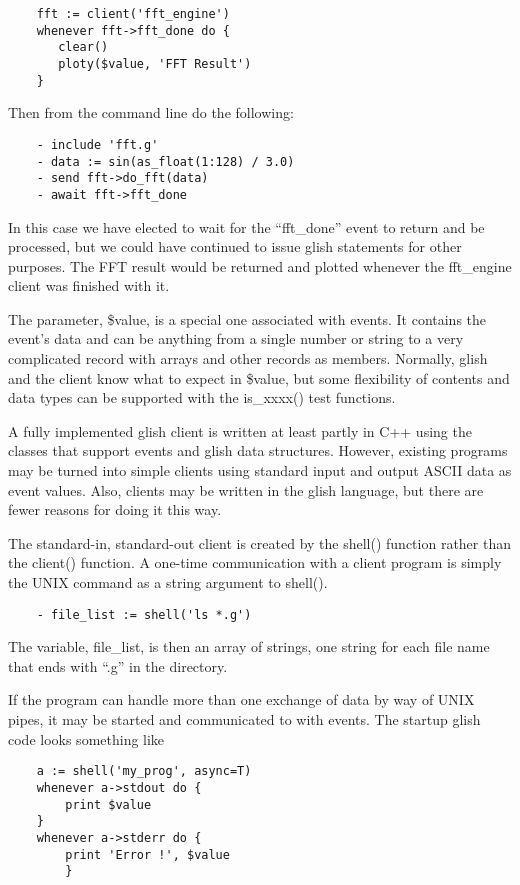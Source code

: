 \begin{verbatim}
	fft := client('fft_engine')
	whenever fft->fft_done do {
	   clear()
	   ploty($value, 'FFT Result')
	}
\end{verbatim}

Then from the command line do the following:

\begin{verbatim}
	- include 'fft.g'
	- data := sin(as_float(1:128) / 3.0)
	- send fft->do_fft(data)
	- await fft->fft_done
\end{verbatim}

    In this case we have elected to wait for the ``fft\_done'' event to return
and be processed, but we could have continued to issue glish statements for
other purposes.  The FFT result would be returned and plotted whenever the
fft\_engine client was finished with it.

    The parameter, \$value, is a special one associated with events.  It
contains the event's data and can be anything from a single number or
string to a very complicated record with arrays and other records as
members.  Normally, glish and the client know what to expect in \$value, but
some flexibility of contents and data types can be supported with the
is\_xxxx() test functions.

    A fully implemented glish client is written at least partly in C++
using the classes that support events and glish data structures.  However,
existing programs may be turned into simple clients using standard input
and output ASCII data as event values.  Also, clients may be written in the
glish language, but there are fewer reasons for doing it this way.

    The standard-in, standard-out client is created by the shell() function
rather than the client() function.  A one-time communication with a client
program is simply the UNIX command as a string argument to shell().

\begin{verbatim}
	- file_list := shell('ls *.g')
\end{verbatim}

The variable, file\_list, is then an array of strings, one string for each
file name that ends with ``.g'' in the directory.

    If the program can handle more than one exchange of data by way of UNIX
pipes, it may be started and communicated to with events.  The startup
glish code looks something like

\begin{verbatim}
	a := shell('my_prog', async=T)
	whenever a->stdout do {
	    print $value
	}
	whenever a->stderr do {
	    print 'Error !', $value
        }
\end{verbatim}

